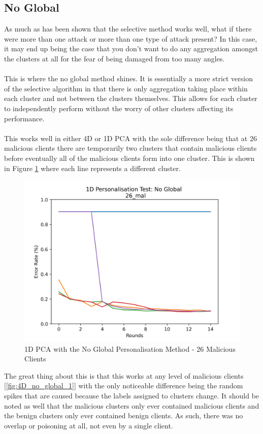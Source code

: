 \subsection{No Global}
As much as has been shown that the selective method works well, what if there were more than one attack or more than one type of attack present?
In this case, it may end up being the case that you don't want to do any aggregation amongst the clusters at all for the fear of being damaged from too many angles.
\\ \\
This is where the no global method shines.
It is essentially a more strict version of the selective algorithm in that there is only aggregation taking place within each cluster and not between the clusters themselves.
This allows for each cluster to independently perform without the worry of other clusters affecting its performance.
\\ \\
This works well in either 4D or 1D PCA with the sole difference being that at 26 malicious clients there are temporarily two clusters that contain malicious clients before eventually all of the malicious clients form into one cluster.
This is shown in Figure \ref{fig:1D_no_global} where each line represents a different cluster.
\begin{figure}[htbp]
	\centering
    \includegraphics[scale=0.5]{my_agg/graphs/1d_no_global.png}
    \caption{1D PCA with the No Global Personalisation Method - 26 Malicious Clients}
	\label{fig:1D_no_global}
\end{figure}
The great thing about this is that this works at any level of malicious clients [\ref{fig:4D_no_global_1}] with the only noticeable difference being the random spikes that are caused because the labels assigned to clusters change.
It should be noted as well that the malicious clusters only ever contained malicious clients and the benign clusters only ever contained benign clients.
As such, there was no overlap or poisoning at all, not even by a single client.

